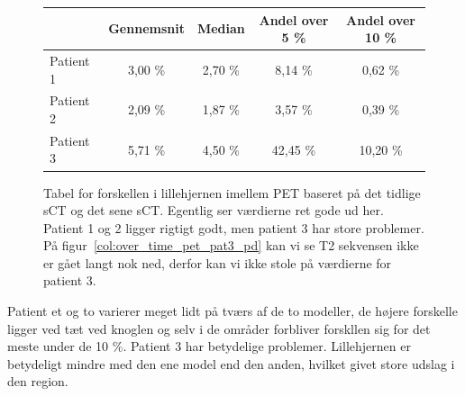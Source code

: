 \begin{figure}
    \centering
    \begin{tabular}{| l | c | c | c | c |}
        \hline
         & Gennemsnit & Median & Andel over 5 \% & Andel over 10 \% \\ \hline
        Patient 1 & 3,00 \% & 2,70 \% & 8,14 \% & 0,62 \% \\ \hline
        Patient 2 & 2,09 \% & 1,87 \% & 3,57 \% & 0,39 \% \\ \hline
        Patient 3 & 5,71 \% & 4,50 \% & 42,45 \% & 10,20 \% \\ \hline
    \end{tabular}
    \caption{Tabel for forskellen i lillehjernen imellem PET baseret på det tidlige sCT og det sene sCT. Egentlig ser værdierne ret gode ud her. Patient 1 og 2 ligger rigtigt godt, men patient 3 har store problemer. På figur~\ref{col:over_time_pet_pat3_pd} kan vi se T2 sekvensen ikke er gået langt nok ned, derfor kan vi ikke stole på værdierne for patient 3.}
    \label{tab:over_tid_lillehjerne}
\end{figure}

Patient et og to varierer meget lidt på tværs af de to modeller, de højere
forskelle ligger ved tæt ved knoglen og selv i de områder forbliver
forskllen sig for det meste under de 10 \%. Patient 3 har betydelige
problemer. Lillehjernen er betydeligt mindre med den ene model end den
anden, hvilket givet store udslag i den region. 

